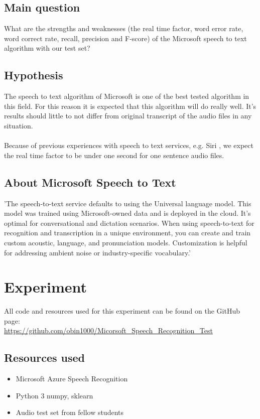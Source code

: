 \documentclass{article}
\begin{document}
\subsection{Main question}
What are the strengths and weaknesses (the real time factor, word error rate, word correct rate, recall, precision and F-score) of the Microsoft speech to text algorithm with our test set?

\subsection{Hypothesis}
The speech to text algorithm of Microsoft is one of the best tested algorithm in this field\cite{Veton}. For this reason it is expected that this algorithm will do really well. It's results should little to not differ from original transcript of the audio files in any situation. \\ \\
Because of previous experiences with speech to text services, e.g. Siri \cite{Siri}, we expect the real time factor to be under one second for one sentence audio files.

\subsection{About Microsoft Speech to Text}
'The speech-to-text service defaults to using the Universal language model. This model was trained using Microsoft-owned data and is deployed in the cloud. It's optimal for conversational and dictation scenarios. When using speech-to-text for recognition and transcription in a unique environment, you can create and train custom acoustic, language, and pronunciation models. Customization is helpful for addressing ambient noise or industry-specific vocabulary.'\cite{Microsoft}

\section{Experiment}
All code and resources used for this experiment can be found on the GitHub page: \\
\url{https://github.com/obin1000/Micorsoft_Speech_Recognition_Test}

\subsection{Resources used}
\begin{itemize}
    \item Microsoft Azure Speech Recognition
    \item Python 3 numpy, sklearn
    \item Audio test set from fellow students
\end{itemize}
\end{document}
